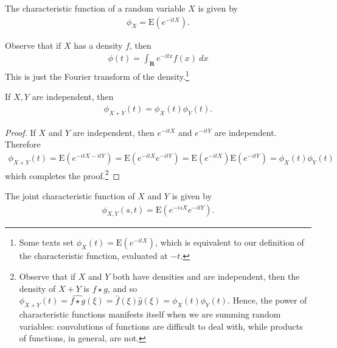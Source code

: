 \begin{definition}
	The characteristic function of a random variable $X$ is given by
	\begin{equation*}
		\begin{split}
			\phi_{X} = \mathrm{E}(e^{-itX}).
		\end{split}
	\end{equation*}
\end{definition}
Observe that if $X$ has a density $f$, then
\begin{equation*}
	\begin{split}
		\phi(t) = \int_{\mathbf{R}} e^{-itx} f(x) \ dx
	\end{split}
\end{equation*}
This is just the Fourier transform of the density.\footnote{Some texts set $\phi_{X}(t) = \mathrm{E}(e^{-itX})$,
	which is equivalent to our definition
of the characteristic function, evaluated at $-t$.} 
\begin{lemma}\label{lem:indep}
	If $X, Y$ are independent, then
	\begin{equation*}
		\begin{split}
			\phi_{X + Y}(t) = \phi_{X}(t) \phi_{Y}(t).
		\end{split}
	\end{equation*}
\end{lemma}
\begin{proof}
	If $X$ and $Y$ are independent, then $e^{-itX}$ and $e^{-itY}$ are independent.
	Therefore
	\begin{equation*}
		\begin{split}
			\phi_{X + Y}(t) = \mathrm{E}(e^{-itX - itY}) = \mathrm{E}(e^{-itX} e^{-itY})
			= \mathrm{E}(e^{-itX}) \mathrm{E} (e^{-itY}) = \phi_{X}(t) \phi_{Y}(t)
		\end{split}
	\end{equation*}
	which completes the proof.\footnote{Observe that if $X$ and $Y$ both have densities and are independent, then 
		the density of $X + Y$ is $f \star g$, and so 
		$\phi_{X + Y}(t) = \widehat{f \star g}(\xi) = \widehat{f}(\xi) \widehat{g}(\xi) =
		\phi_{X}(t) \phi_{Y}(t)$. Hence, the power of characteristic functions
		manifests itself when we are summing random variables: convolutions of
		functions are difficult to deal with, while products of functions, in general,
	are not.}
\end{proof}
\begin{definition}
	The joint characteristic function of $X$ and $Y$ is given by
	\begin{equation*}
		\begin{split}
			\phi_{X,Y}(s,t) = \mathrm{E}(e^{-isX} e^{-itY}).
		\end{split}
	\end{equation*}
\end{definition}
